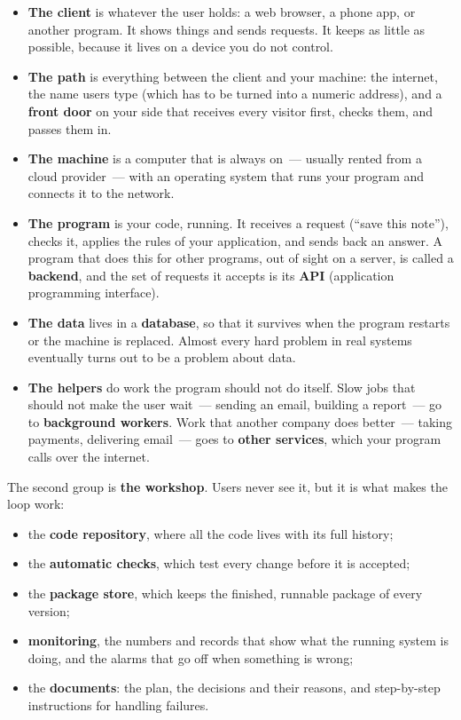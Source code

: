 \begin{itemize}
\tightlist
\item
  \textbf{The client} is whatever the user holds: a web browser, a phone app, or another program. It shows things and sends requests. It keeps as little as possible, because it lives on a device you do not control.
\item
  \textbf{The path} is everything between the client and your machine: the internet, the name users type (which has to be turned into a numeric address), and a \textbf{front door} on your side that receives every visitor first, checks them, and passes them in.
\item
  \textbf{The machine} is a computer that is always on~--- usually rented from a cloud provider~--- with an operating system that runs your program and connects it to the network.
\item
  \textbf{The program} is your code, running. It receives a request (``save this note''), checks it, applies the rules of your application, and sends back an answer. A program that does this for other programs, out of sight on a server, is called a \textbf{backend}, and the set of requests it accepts is its \textbf{API} (application programming interface).
\item
  \textbf{The data} lives in a \textbf{database}, so that it survives when the program restarts or the machine is replaced. Almost every hard problem in real systems eventually turns out to be a problem about data.
\item
  \textbf{The helpers} do work the program should not do itself. Slow jobs that should not make the user wait~--- sending an email, building a report~--- go to \textbf{background workers}. Work that another company does better~--- taking payments, delivering email~--- goes to \textbf{other services}, which your program calls over the internet.
\end{itemize}

\noindent{}The second group is \textbf{the workshop}. Users never see it, but it is what makes the loop work:

\begin{itemize}
\tightlist
\item
  the \textbf{code repository}, where all the code lives with its full history;
\item
  the \textbf{automatic checks}, which test every change before it is accepted;
\item
  the \textbf{package store}, which keeps the finished, runnable package of every version;
\item
  \textbf{monitoring}, the numbers and records that show what the running system is doing, and the alarms that go off when something is wrong;
\item
  the \textbf{documents}: the plan, the decisions and their reasons, and step-by-step instructions for handling failures.
\end{itemize}

